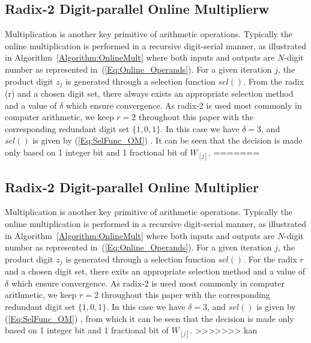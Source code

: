 \documentclass{acm_proc_article-sp}
\begin{document}
\subsection{Radix-2 Digit-parallel Online Multiplierw \label{OnlineMultSection}}
Multiplication is another key primitive of arithmetic operations. Typically the online multiplication is performed in a recursive digit-serial manner, as illustrated in Algorithm~\ref{Algorithm:OnlineMult} where both inputs and outputs are $N$-digit number as represented in~(\ref{Eq:Online_Operands}). For a given iteration $j$, the product digit $z_j$ is generated through a selection function $sel()$. From the radix (r) and a chosen digit set, there always exists an appropriate selection method and a value of $\delta$ which ensure convergence. As radix-2 is used most commonly in computer arithmetic, we keep $r=2$ throughout this paper with the corresponding redundant digit set $\{\overline{1},0,1\}$. In this case we have $\delta=3$, and $sel()$ is given by (\ref{Eq:SelFunc_OM}) \cite{Oregon_OnlineNetwork}. It can be seen that the decision is made only based on 1 integer bit and 1 fractional bit of $W_{[j]}$.
=======
\subsection{Radix-2 Digit-parallel Online Multiplier}\label{subsec:OnlineMultiplier}
Multiplication is another key primitive of arithmetic operations. Typically the online multiplication is performed in a recursive digit-serial manner, as illustrated in Algorithm~\ref{Algorithm:OnlineMult} where both inputs and outputs are $N$-digit number as represented in~(\ref{Eq:Online_Operands}). For a given iteration $j$, the product digit $z_j$ is generated through a selection function $sel()$. For the radix $r$ and a chosen digit set, there exits an appropriate selection method and a value of $\delta$ which ensure convergence. As radix-2 is used most commonly in computer arithmetic, we keep $r=2$ throughout this paper with the corresponding redundant digit set $\{\overline{1},0,1\}$. In this case we have $\delta=3$, and $sel()$ is given by (\ref{Eq:SelFunc_OM}) \cite{Oregon_OnlineNetwork}, from which it can be seen that the decision is made only based on 1 integer bit and 1 fractional bit of $W_{[j]}$.
>>>>>>> kan
\end{document}
